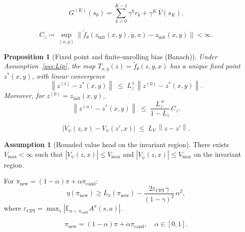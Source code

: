 \documentclass{article}
\theoremstyle{plain}
\newtheorem{proposition}[theorem]{Proposition}
\theoremstyle{definition}
\newtheorem{assumption}[theorem]{Assumption}
\theoremstyle{remark}
\newcommand{\E}{\mathbb{E}}
\newcommand{\norm}[1]{\left\lVert #1 \right\rVert}
\begin{document}
\begin{equation}
G^{(K)}(s_0)
=
\sum_{k=0}^{K-1}\gamma^k r_k
+
\gamma^K \, \bar V(s_K).
\label{eq:GK_def}
\end{equation}

\begin{equation}
C_z \coloneqq \sup_{(x,y)}\bigl\|\tilde f_\theta(z_{\mathrm{init}}(x,y),y,x)-z_{\mathrm{init}}(x,y)\bigr\|<\infty.
\label{eq:Cz_def}
\end{equation}

\begin{proposition}[Fixed point and finite-unrolling bias (Banach)]
\label{prop:banach}
Under Assumption~\ref{ass:Lip}, the map $T_{x,y}(z)=\tilde f_\theta(z,y,x)$ has a unique fixed point $z^*(x,y)$, with linear convergence
\begin{equation}
\norm{z^{(t)} - z^*(x,y)}
\;\le\;
L_z^{\,t}\,\norm{z^{(0)} - z^*(x,y)}.
\label{eq:linear_convergence}
\end{equation}
Moreover, for $z^{(0)}=z_{\mathrm{init}}(x,y)$,
\begin{equation}
\norm{z^{(n)}-z^*(x,y)}
\;\le\;
\frac{L_z^{\,n}}{1-L_z}\,C_z.
\label{eq:finite_unrolling_bias}
\end{equation}
\end{proposition}

\begin{equation}
\bigl|V_\psi(z,x)-V_\psi(z',x)\bigr|
\;\le\;
L_V\,\norm{z-z'}.
\label{eq:LV_def}
\end{equation}

\begin{assumption}[Bounded value head on the invariant region]
\label{ass:bounded_value_head}
There exists $V_{\max}<\infty$ such that $|V_\psi(z,x)| \le V_{\max}$ and $|V_{\bar\psi}(z,x)| \le V_{\max}$ on the invariant region.
\end{assumption}

For $\pi_{\mathrm{new}} = (1-\alpha)\pi + \alpha\pi_{\mathrm{cand}}$:
\begin{equation}
\eta(\pi_{\mathrm{new}}) \ge L_\pi(\pi_{\mathrm{new}}) - \frac{2\varepsilon_{\mathrm{CPI}}\,\gamma}{(1-\gamma)^2}\,\alpha^2,
\label{eq:cpi_bound}
\end{equation}
where $\varepsilon_{\mathrm{CPI}} = \max_s|\E_{a\sim\pi_{\mathrm{cand}}}A^\pi(s,a)|$.

\begin{equation}
\pi_{\mathrm{new}} = (1-\alpha)\pi + \alpha\pi_{\mathrm{cand}}, \quad \alpha\in[0,1].
\label{eq:pi_mixture}
\end{equation}
\end{document}
